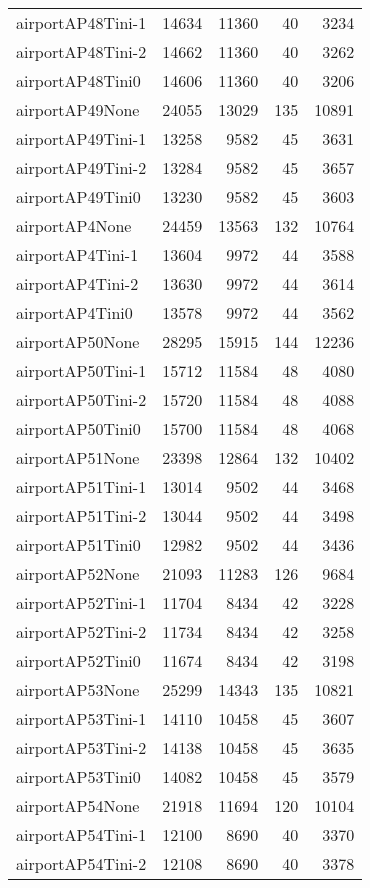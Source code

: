 \begin{longtable}{lrrrr}
airportAP48Tini-1 & 14634 & 11360 & 40 & 3234 \\
airportAP48Tini-2 & 14662 & 11360 & 40 & 3262 \\
airportAP48Tini0 & 14606 & 11360 & 40 & 3206 \\
airportAP49None & 24055 & 13029 & 135 & 10891 \\
airportAP49Tini-1 & 13258 & 9582 & 45 & 3631 \\
airportAP49Tini-2 & 13284 & 9582 & 45 & 3657 \\
airportAP49Tini0 & 13230 & 9582 & 45 & 3603 \\
airportAP4None & 24459 & 13563 & 132 & 10764 \\
airportAP4Tini-1 & 13604 & 9972 & 44 & 3588 \\
airportAP4Tini-2 & 13630 & 9972 & 44 & 3614 \\
airportAP4Tini0 & 13578 & 9972 & 44 & 3562 \\
airportAP50None & 28295 & 15915 & 144 & 12236 \\
airportAP50Tini-1 & 15712 & 11584 & 48 & 4080 \\
airportAP50Tini-2 & 15720 & 11584 & 48 & 4088 \\
airportAP50Tini0 & 15700 & 11584 & 48 & 4068 \\
airportAP51None & 23398 & 12864 & 132 & 10402 \\
airportAP51Tini-1 & 13014 & 9502 & 44 & 3468 \\
airportAP51Tini-2 & 13044 & 9502 & 44 & 3498 \\
airportAP51Tini0 & 12982 & 9502 & 44 & 3436 \\
airportAP52None & 21093 & 11283 & 126 & 9684 \\
airportAP52Tini-1 & 11704 & 8434 & 42 & 3228 \\
airportAP52Tini-2 & 11734 & 8434 & 42 & 3258 \\
airportAP52Tini0 & 11674 & 8434 & 42 & 3198 \\
airportAP53None & 25299 & 14343 & 135 & 10821 \\
airportAP53Tini-1 & 14110 & 10458 & 45 & 3607 \\
airportAP53Tini-2 & 14138 & 10458 & 45 & 3635 \\
airportAP53Tini0 & 14082 & 10458 & 45 & 3579 \\
airportAP54None & 21918 & 11694 & 120 & 10104 \\
airportAP54Tini-1 & 12100 & 8690 & 40 & 3370 \\
airportAP54Tini-2 & 12108 & 8690 & 40 & 3378 \\

\end{longtable}
